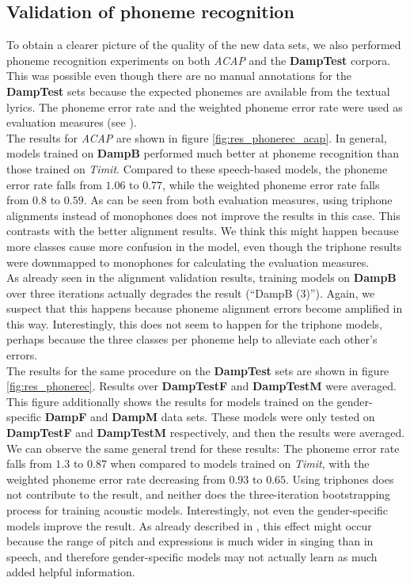 \subsection{Validation of phoneme recognition}
To obtain a clearer picture of the quality of the new data sets, we also performed phoneme recognition experiments on both \textit{ACAP} and the \textbf{DampTest} corpora. This was possible even though there are no manual annotations for the \textbf{DampTest} sets because the expected phonemes are available from the textual lyrics. The phoneme error rate and the weighted phoneme error rate were used as evaluation measures (see \cite{kruspe_phonerec}).\\
The results for \textit{ACAP} are shown in figure \ref{fig:res_phonerec_acap}. In general, models trained on \textbf{DampB} performed much better at phoneme recognition than those trained on \textit{Timit}. Compared to these speech-based models, the phoneme error rate falls from $1.06$ to $0.77$, while the weighted phoneme error rate falls from $0.8$ to $0.59$. As can be seen from both evaluation measures, using triphone alignments instead of monophones does not improve the results in this case. This contrasts with the better alignment results. We think this might happen because more classes cause more confusion in the model, even though the triphone results were downmapped to monophones for calculating the evaluation measures.\\
As already seen in the alignment validation results, training models on \textbf{DampB} over three iterations actually degrades the result (``DampB (3)''). Again, we suspect that this happens because phoneme alignment errors become amplified in this way. Interestingly, this does not seem to happen for the triphone models, perhaps because the three classes per phoneme help to alleviate each other's errors.\\
The results for the same procedure on the \textbf{DampTest} sets are shown in figure \ref{fig:res_phonerec}. Results over \textbf{DampTestF} and \textbf{DampTestM} were averaged. This figure additionally shows the results for models trained on the gender-specific \textbf{DampF} and \textbf{DampM} data sets. These models were only tested on \textbf{DampTestF} and \textbf{DampTestM} respectively, and then the results were averaged.\\
We can observe the same general trend for these results: The phoneme error rate falls from $1.3$ to $0.87$ when compared to models trained on \textit{Timit}, with the weighted phoneme error rate decreasing from $0.93$ to $0.65$. Using triphones does not contribute to the result, and neither does the three-iteration bootstrapping process for training acoustic models. Interestingly, not even the gender-specific models improve the result. As already described in \cite{kruspe_phonerec}, this effect might occur because the range of pitch and expressions is much wider in singing than in speech, and therefore gender-specific models may not actually learn as much added helpful information.



